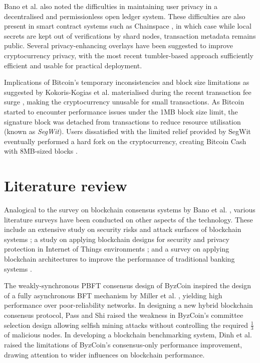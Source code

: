 \documentclass[11pt]{article}
\begin{document}
Bano et al. \cite[IX. D.]{bano2017consensus} also noted the difficulties in maintaining user privacy in a decentralised and permissionless open ledger system. These difficulties are also present in smart contract systems such as Chainspace \cite[II. A.]{al2017chainspace}, in which case while local secrets are kept out of verifications by shard nodes, transaction metadata remains public. Several privacy-enhancing overlays \cite{meiklejohn2015privacy} have been suggested to improve cryptocurrency privacy, with the most recent tumbler-based approach \cite{meiklejohn2018mobius} sufficiently efficient and usable for practical deployment.

Implications of Bitcoin's temporary inconsistencies and block size limitations as suggested by Kokoris-Kogias et al. \cite[2.1]{kogias2016enhancing} materialised during the recent transaction fee surge \cite{btc}, making the cryptocurrency unusable for small transactions. As Bitcoin started to encounter performance issues under the 1MB block size limit, the signature block was detached from transactions to reduce resource utilisation \cite{segwit} (known as \emph{SegWit}). Users dissatisfied with the limited relief provided by SegWit eventually performed a hard fork on the cryptocurrency, creating Bitcoin Cash with 8MB-sized blocks \cite{bth}.

\section{Literature review}

Analogical to the survey on blockchain consensus systems by Bano et al. \cite{bano2017consensus}, various literature surveys have been conducted on other aspects of the technology. These include an extensive study on security risks and attack surfaces of blockchain systems \cite{li2017survey}; a study on applying blockchain designs for security and privacy protection in Internet of Things environments \cite{atzori2016blockchain}; and a survey on applying blockchain architectures to improve the performance of traditional banking systems \cite{guo2016blockchain}.

The weakly-synchronous PBFT consensus design of ByzCoin \cite{kogias2016enhancing} inspired the design of a fully asynchronous BFT mechanism by Miller et al. \cite{miller2016honey}, yielding high performance over poor-reliability networks. In designing a new hybrid blockchain consensus protocol, Pass and Shi \cite[Sec. 5]{pass2017hybrid} raised the weakness in ByzCoin's committee selection design allowing selfish mining attacks without controlling the required $\frac{1}{3}$ of malicious nodes. In developing a blockchain benchmarking system, Dinh et al. \cite{dinh2017blockbench} raised the limitations of ByzCoin's consensus-only performance improvement, drawing attention to wider influences on blockchain performance.
\end{document}
